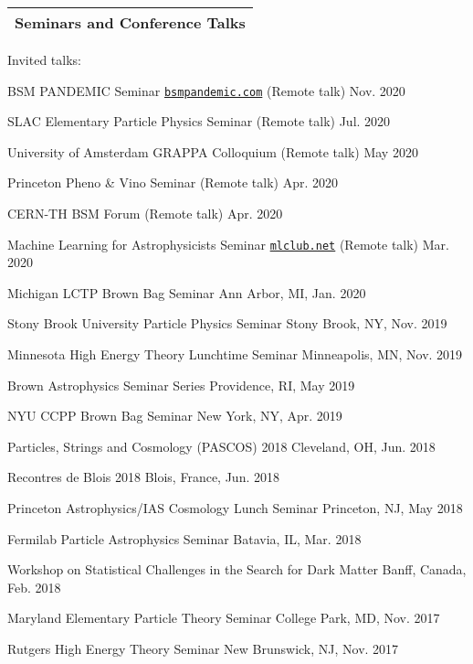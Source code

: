 \documentclass[11pt]{article}
\newenvironment{packed_itemize}{
\begin{itemize}[label=\raisebox{0.25ex}{\tiny$\bullet$}]
  \setlength{\itemsep}{3pt}
  \setlength{\parskip}{0pt}
  \setlength{\parsep}{0pt}}{\end{itemize}
}
\begin{document}
\noindent
\begin{tabular*}{\textwidth}{l@{\extracolsep{\fill}}}
\large {\sc \Large{Seminars and Conference Talks}}\\
\hline
\end{tabular*}\vspace{3.5mm}
\noindent
Invited talks:
\begin{packed_itemize}
\item BSM PANDEMIC Seminar \href{https://www.bsmpandemic.com/ }{\texttt{bsmpandemic.com}} (Remote talk) \hfill Nov. 2020
\item SLAC Elementary Particle Physics Seminar (Remote talk) \hfill Jul. 2020
\item University of Amsterdam GRAPPA Colloquium (Remote talk) \hfill May 2020
\item Princeton Pheno \& Vino Seminar (Remote talk) \hfill Apr. 2020
\item CERN-TH BSM Forum (Remote talk) \hfill  Apr. 2020
\item Machine Learning for Astrophysicists Seminar \href{https://docs.google.com/document/d/1GGtE-YIuAWlmpKSr38_kyiF-Fklszhkh4FkiYWzBAho/pub}{\texttt{mlclub.net}} (Remote talk) \hfill  Mar. 2020
\item Michigan LCTP Brown Bag Seminar \hfill Ann Arbor, MI, Jan. 2020
\item Stony Brook University Particle Physics Seminar \hfill Stony Brook, NY, Nov. 2019
\item Minnesota High Energy Theory Lunchtime Seminar \hfill  Minneapolis, MN, Nov. 2019
\item Brown Astrophysics Seminar Series \hfill Providence, RI, May 2019
\item NYU CCPP Brown Bag Seminar \hfill New York, NY, Apr. 2019
\item Particles, Strings and Cosmology (PASCOS) 2018 \hfill Cleveland, OH, Jun. 2018
\item Recontres de Blois 2018 \hfill Blois, France, Jun. 2018
\item Princeton Astrophysics/IAS Cosmology Lunch Seminar \hfill Princeton, NJ, May 2018
\item Fermilab Particle Astrophysics Seminar \hfill Batavia, IL, Mar. 2018
\item Workshop on Statistical Challenges in the Search for Dark Matter \hfill Banff, Canada, Feb. 2018
\item Maryland Elementary Particle Theory Seminar \hfill College Park, MD, Nov. 2017
\item Rutgers High Energy Theory Seminar \hfill New Brunswick, NJ, Nov. 2017

\end{packed_itemize}
\end{document}

